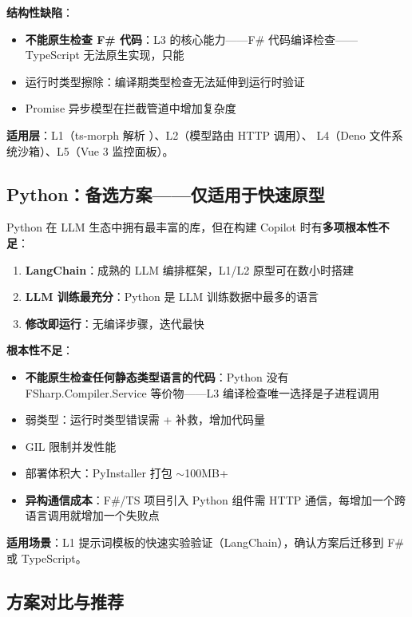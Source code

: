 \documentclass[10pt, openany]{book}
\begin{document}
\textbf{结构性缺陷}：
\begin{itemize}
    \item \textbf{不能原生检查 F\# 代码}：L3 的核心能力——F\# 代码编译检查——TypeScript 无法原生实现，只能 
    \item 运行时类型擦除：编译期类型检查无法延伸到运行时验证
    \item Promise 异步模型在拦截管道中增加复杂度
\end{itemize}

\textbf{适用层}：L1（ts-morph 解析 ）、L2（模型路由 HTTP 调用）、
L4（Deno 文件系统沙箱）、L5（Vue 3 监控面板）。

\subsection{Python：备选方案——仅适用于快速原型}

Python 在 LLM 生态中拥有最丰富的库，但在构建 Copilot 时有\textbf{多项根本性不足}：

\begin{enumerate}
    \item \textbf{LangChain}：成熟的 LLM 编排框架，L1/L2 原型可在数小时搭建
    \item \textbf{LLM 训练最充分}：Python 是 LLM 训练数据中最多的语言
    \item \textbf{修改即运行}：无编译步骤，迭代最快
\end{enumerate}

\textbf{根本性不足}：
\begin{itemize}
    \item \textbf{不能原生检查任何静态类型语言的代码}：Python 没有 FSharp.Compiler.Service 等价物——L3 编译检查唯一选择是子进程调用
    \item 弱类型：运行时类型错误需  +  补救，增加代码量
    \item GIL 限制并发性能
    \item 部署体积大：PyInstaller 打包 \(\sim\)100MB+
    \item \textbf{异构通信成本}：F\#/TS 项目引入 Python 组件需 HTTP 通信，每增加一个跨语言调用就增加一个失败点
\end{itemize}

\textbf{适用场景}：L1 提示词模板的快速实验验证（LangChain），确认方案后迁移到 F\# 或 TypeScript。

\subsection{方案对比与推荐}
\end{document}
